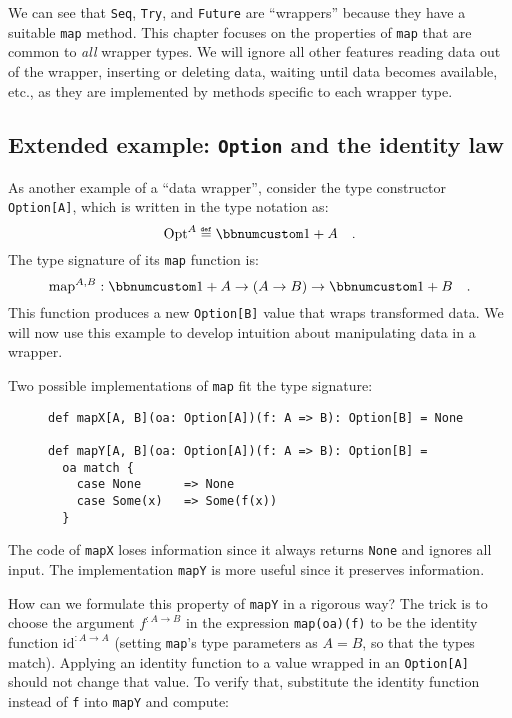 We can see that \lstinline!Seq!, \lstinline!Try!, and \lstinline!Future!
are \textsf{``}wrappers\textsf{''} because they have a suitable \lstinline!map! method.
This chapter focuses on the properties of \lstinline!map! that are
common to \emph{all} wrapper types. We will ignore all other features
\textemdash{} reading data out of the wrapper, inserting or deleting
data, waiting until data becomes available, etc., \textemdash{} as
they are implemented by methods specific to each wrapper type.

\subsection{Extended example: \texttt{Option} and the identity law\label{subsec:f-Example:-Option-and}}

As another example of a \textsf{``}data wrapper\textsf{''}, consider the type constructor
\lstinline!Option[A]!, which is written in the type notation as:
\[
\text{Opt}^{A}\triangleq\bbnum 1+A\quad.
\]
The type signature of its \lstinline!map! function is:
\[
\text{map}^{A,B}:\bbnum 1+A\rightarrow\left(A\rightarrow B\right)\rightarrow\bbnum 1+B\quad.
\]
This function produces a new \lstinline!Option[B]! value that wraps
transformed data. We will now use this example to develop intuition
about manipulating data in a wrapper.

Two possible implementations of \lstinline!map! fit the type signature:

\begin{wrapfigure}{l}{0.585\columnwidth}%
\vspace{-0.7\baselineskip}
\begin{lstlisting}
def mapX[A, B](oa: Option[A])(f: A => B): Option[B] = None

def mapY[A, B](oa: Option[A])(f: A => B): Option[B] =
  oa match {
    case None      => None
    case Some(x)   => Some(f(x))
  }
\end{lstlisting}
\vspace{-1\baselineskip}
\end{wrapfigure}%

\noindent The code of \lstinline!mapX! loses information
since it always returns \lstinline!None! and ignores all input. The
implementation \lstinline!mapY! is more useful since it preserves
information. 

How can we formulate this property of \lstinline!mapY! in a rigorous
way? The trick is to choose the argument $f^{:A\rightarrow B}$ in
the expression \lstinline!map(oa)(f)! to be the identity function
$\text{id}^{:A\rightarrow A}$ (setting \lstinline!map!\textsf{'}s type parameters
as $A=B$, so that the types match). Applying an identity function
to a value wrapped in an \lstinline!Option[A]! should not change
that value. To verify that, substitute the identity function instead
of \lstinline!f! into \lstinline!mapY! and compute:

